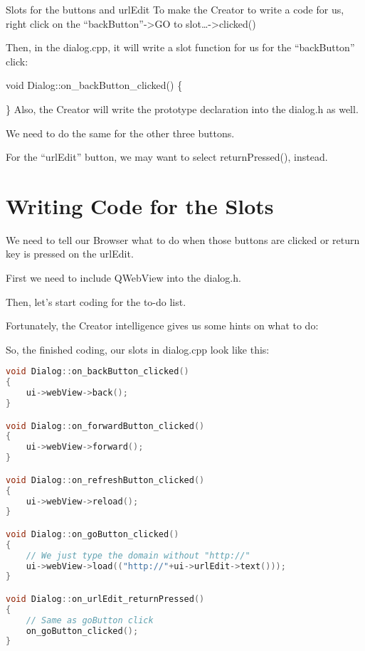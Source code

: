 \begin{figure}[htbp]
\centering
{}
\caption{}
\end{figure}

Slots for the buttons and urlEdit To make the Creator to write a code
for us, right click on the ``backButton''-\textgreater{}GO to
slot\ldots{}-\textgreater{}clicked()

\begin{figure}[htbp]
\centering
{}
\caption{}
\end{figure}

Then, in the dialog.cpp, it will write a slot function for us for the
``backButton'' click:

void Dialog::on\_backButton\_clicked() \{

\} Also, the Creator will write the prototype declaration into the
dialog.h as well.

We need to do the same for the other three buttons.

For the ``urlEdit'' button, we may want to select returnPressed(),
instead.

\section{Writing Code for the
Slots}\label{writing-code-for-the-slots}

We need to tell our Browser what to do when those buttons are clicked or
return key is pressed on the urlEdit.

First we need to include QWebView into the dialog.h.

Then, let's start coding for the to-do list.

Fortunately, the Creator intelligence gives us some hints on what to do:

\begin{figure}[htbp]
\centering
{}
\caption{}
\end{figure}

So, the finished coding, our slots in dialog.cpp look like this:

\begin{lstlisting}[language=c++, numbers=none]
void Dialog::on_backButton_clicked()
{
    ui->webView->back();
}

void Dialog::on_forwardButton_clicked()
{
    ui->webView->forward();
}

void Dialog::on_refreshButton_clicked()
{
    ui->webView->reload();
}

void Dialog::on_goButton_clicked()
{
    // We just type the domain without "http://"
    ui->webView->load(("http://"+ui->urlEdit->text()));
}

void Dialog::on_urlEdit_returnPressed()
{
    // Same as goButton click
    on_goButton_clicked();
}
\end{lstlisting}

